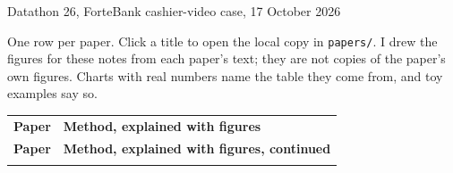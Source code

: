 \documentclass[10pt]{article}
\newlength{\papercolw}\setlength{\papercolw}{5.0cm}
\newlength{\desccolw}\setlength{\desccolw}{\dimexpr\textwidth-\papercolw-2\tabcolsep\relax}
\begin{document}
\hfill
{\scriptsize\color{ink2}Datathon 26, ForteBank cashier-video case, 17 October 2026}\par
\vspace{4pt}
\noindent\begin{minipage}{0.8\textwidth}\small\color{ink2}
One row per paper. Click a title to open the local copy in \texttt{papers/}. I drew the figures
for these notes from each paper's text; they are not copies of the paper's own figures.
Charts with real numbers name the table they come from, and toy examples say so.
\end{minipage}\par\vspace{8pt}

\begin{longtable}{@{}p{\papercolw}p{\desccolw}@{}}
\arrayrulecolor{ink}\toprule
{\scriptsize\bfseries Paper} & {\scriptsize\bfseries Method, explained with figures} \\
\arrayrulecolor{grid}\midrule
\endfirsthead
\arrayrulecolor{ink}\toprule
{\scriptsize\bfseries Paper} & {\scriptsize\bfseries Method, explained with figures, continued} \\
\arrayrulecolor{grid}\midrule
\endhead
\arrayrulecolor{ink}\bottomrule
\endlastfoot


\end{longtable}
\end{document}
